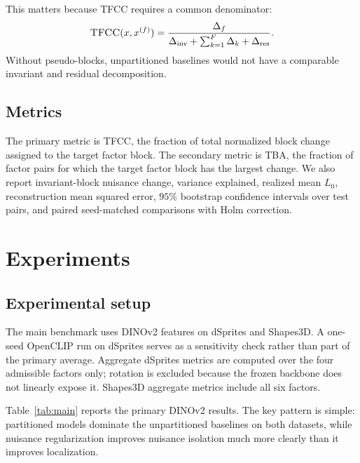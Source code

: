 \documentclass[10pt,twocolumn]{article}
\newcommand{\tfcc}{\textsc{TFCC}}
\newcommand{\tba}{\textsc{TBA}}
\begin{document}
This matters because \tfcc{} requires a common denominator:
\begin{equation}
\mathrm{\tfcc}(x, x^{(f)}) =
\frac{\Delta_f}{\Delta_{\mathrm{inv}} + \sum_{k=1}^{F} \Delta_k + \Delta_{\mathrm{res}}}.
\end{equation}
Without pseudo-blocks, unpartitioned baselines would not have a comparable invariant and residual decomposition.

\subsection{Metrics}
The primary metric is \tfcc{}, the fraction of total normalized block change assigned to the target factor block. The secondary metric is \tba{}, the fraction of factor pairs for which the target factor block has the largest change. We also report invariant-block nuisance change, variance explained, realized mean $L_0$, reconstruction mean squared error, $95\%$ bootstrap confidence intervals over test pairs, and paired seed-matched comparisons with Holm correction.

\section{Experiments}
\label{sec:experiments}
\subsection{Experimental setup}
The main benchmark uses DINOv2 features on dSprites and Shapes3D. A one-seed OpenCLIP run on dSprites serves as a sensitivity check rather than part of the primary average. Aggregate dSprites metrics are computed over the four admissible factors only; rotation is excluded because the frozen backbone does not linearly expose it. Shapes3D aggregate metrics include all six factors.

Table~\ref{tab:main} reports the primary DINOv2 results. The key pattern is simple: partitioned models dominate the unpartitioned baselines on both datasets, while nuisance regularization improves nuisance isolation much more clearly than it improves localization.
\end{document}

